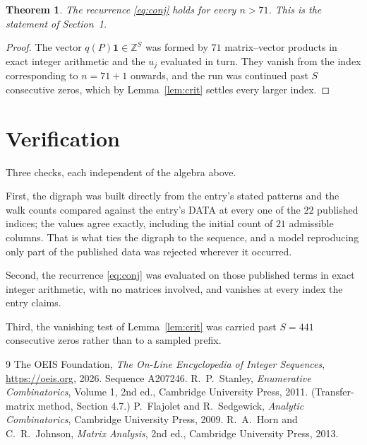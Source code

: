 \documentclass[11pt,a4paper]{article}
\theoremstyle{plain}
\newtheorem{theorem}{Theorem}
\theoremstyle{definition}
\begin{document}
\begin{theorem}
The recurrence \eqref{eq:conj} holds for every $n>71$. This is the statement of
Section~1.
\end{theorem}

\begin{proof}
The vector $q(P)\mathbf{1}\in\mathbb{Z}^{S}$ was formed by $71$ matrix--vector
products in exact integer arithmetic and the $u_j$ evaluated in turn. They vanish from the
index corresponding to $n=71+1$ onwards, and the run was continued past $S$ consecutive
zeros, which by Lemma~\ref{lem:crit} settles every larger index.
\end{proof}

\section{Verification}

Three checks, each independent of the algebra above.

First, the digraph was built directly from the entry's stated patterns and the walk counts
compared against the entry's DATA at every one of the $22$ published indices; the
values agree exactly, including the initial count of $21$ admissible columns. That is
what ties the digraph to the sequence, and a model reproducing only part of the published
data was rejected wherever it occurred.

Second, the recurrence \eqref{eq:conj} was evaluated on those published terms in exact
integer arithmetic, with no matrices involved, and vanishes at every index the entry claims.

Third, the vanishing test of Lemma~\ref{lem:crit} was carried past $S=441$ consecutive
zeros rather than to a sampled prefix.

\begin{thebibliography}{9}
 The OEIS Foundation, \emph{The On-Line Encyclopedia of Integer
Sequences}, \url{https://oeis.org}, 2026. Sequence A207246.
 R.~P.~Stanley, \emph{Enumerative Combinatorics}, Volume 1, 2nd ed.,
Cambridge University Press, 2011. (Transfer-matrix method, Section 4.7.)
 P.~Flajolet and R.~Sedgewick, \emph{Analytic Combinatorics}, Cambridge
University Press, 2009.
 R.~A.~Horn and C.~R.~Johnson, \emph{Matrix Analysis}, 2nd ed., Cambridge
University Press, 2013.
\end{thebibliography}
\end{document}
